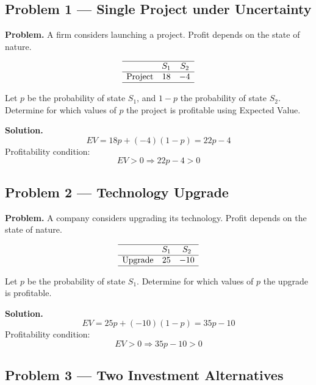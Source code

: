 	\begin{ExamProblems}
		\hypertarget{c7-ex1}{}
		\item
		\subsection*{Problem 1 — Single Project under Uncertainty}
		
		\textbf{Problem.}
		A firm considers launching a project. Profit depends on the state of nature.
		
		\[
		\begin{array}{lcc}
		\hline
		 & S_1 & S_2 \\
		\hline
		\text{Project} & 18 & -4 \\
		\hline
		\end{array}
		\]
		
		Let \(p\) be the probability of state \(S_1\), and \(1-p\) the probability of state \(S_2\).  
		Determine for which values of \(p\) the project is profitable using Expected Value.
		
		\textbf{Solution.}
		\[
		EV = 18p + (-4)(1-p) = 22p - 4
		\]
		Profitability condition:
		\[
		EV>0 \Rightarrow 22p-4>0
		\]
		
		\hypertarget{c7-ex2}{}
		\item
		\subsection*{Problem 2 — Technology Upgrade}
		
		\textbf{Problem.}
		A company considers upgrading its technology. Profit depends on the state of nature.
		
		\[
		\begin{array}{lcc}
		\hline
		 & S_1 & S_2 \\
		\hline
		\text{Upgrade} & 25 & -10 \\
		\hline
		\end{array}
		\]
		
		Let \(p\) be the probability of state \(S_1\).  
		Determine for which values of \(p\) the upgrade is profitable.
		
		\textbf{Solution.}
		\[
		EV = 25p + (-10)(1-p) = 35p - 10
		\]
		Profitability condition:
		\[
		EV>0 \Rightarrow 35p-10>0
		\]
		
		\hypertarget{c7-ex3}{}
		\item
		\subsection*{Problem 3 — Two Investment Alternatives}
		

\end{ExamProblems}
